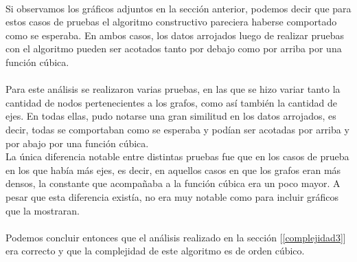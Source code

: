 \paragraph{}
Si observamos los gráficos adjuntos en la sección anterior, podemos decir que para estos casos de pruebas el algoritmo constructivo pareciera haberse comportado como se esperaba. En ambos casos, los datos arrojados luego de realizar pruebas con el algoritmo pueden ser acotados tanto por debajo como por arriba por una función cúbica.

\paragraph{}
Para este análisis se realizaron varias pruebas, en las que se hizo variar tanto la cantidad de nodos pertenecientes a los grafos, como así también la cantidad de ejes. En todas ellas, pudo notarse una gran similitud en los datos arrojados, es decir, todas se comportaban como se esperaba y podían ser acotadas por arriba y por abajo por una función cúbica.\\
La única diferencia notable entre distintas pruebas fue que en los casos de prueba en los que había más ejes, es decir, en aquellos casos en que los grafos eran más densos, la constante que acompañaba a la función cúbica era un poco mayor. A pesar que esta diferencia existía, no era muy notable como para incluir gráficos que la mostraran.

\paragraph{}
Podemos concluir entonces que el análisis realizado en la sección [\ref{complejidad3}] era correcto y que la complejidad de este algoritmo es de orden cúbico.
